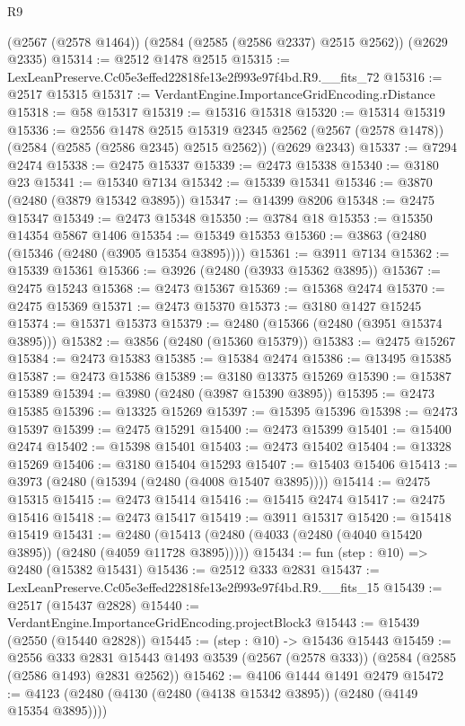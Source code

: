 \begin{lexlean}{R9}
\begin{coremodule}
    (@2567 (@2578 @1464))
    (@2584 (@2585 (@2586 @2337) @2515 @2562))
    (@2629 @2335)
@15314 := @2512 @1478 @2515
@15315 := LexLeanPreserve.Cc05e3effed22818fe13e2f993e97f4bd.R9.__fits_72
@15316 := @2517 @15315
@15317 := VerdantEngine.ImportanceGridEncoding.rDistance
@15318 := @58 @15317
@15319 := @15316 @15318
@15320 := @15314 @15319
@15336 := @2556
    @1478
    @2515
    @15319
    @2345
    @2562
    (@2567 (@2578 @1478))
    (@2584 (@2585 (@2586 @2345) @2515 @2562))
    (@2629 @2343)
@15337 := @7294 @2474
@15338 := @2475 @15337
@15339 := @2473 @15338
@15340 := @3180 @23
@15341 := @15340 @7134
@15342 := @15339 @15341
@15346 := @3870 (@2480 (@3879 @15342 @3895))
@15347 := @14399 @8206
@15348 := @2475 @15347
@15349 := @2473 @15348
@15350 := @3784 @18
@15353 := @15350 @14354 @5867 @1406
@15354 := @15349 @15353
@15360 := @3863 (@2480 (@15346 (@2480 (@3905 @15354 @3895))))
@15361 := @3911 @7134
@15362 := @15339 @15361
@15366 := @3926 (@2480 (@3933 @15362 @3895))
@15367 := @2475 @15243
@15368 := @2473 @15367
@15369 := @15368 @2474
@15370 := @2475 @15369
@15371 := @2473 @15370
@15373 := @3180 @1427 @15245
@15374 := @15371 @15373
@15379 := @2480 (@15366 (@2480 (@3951 @15374 @3895)))
@15382 := @3856 (@2480 (@15360 @15379))
@15383 := @2475 @15267
@15384 := @2473 @15383
@15385 := @15384 @2474
@15386 := @13495 @15385
@15387 := @2473 @15386
@15389 := @3180 @13375 @15269
@15390 := @15387 @15389
@15394 := @3980 (@2480 (@3987 @15390 @3895))
@15395 := @2473 @15385
@15396 := @13325 @15269
@15397 := @15395 @15396
@15398 := @2473 @15397
@15399 := @2475 @15291
@15400 := @2473 @15399
@15401 := @15400 @2474
@15402 := @15398 @15401
@15403 := @2473 @15402
@15404 := @13328 @15269
@15406 := @3180 @15404 @15293
@15407 := @15403 @15406
@15413 := @3973 (@2480 (@15394 (@2480 (@4008 @15407 @3895))))
@15414 := @2475 @15315
@15415 := @2473 @15414
@15416 := @15415 @2474
@15417 := @2475 @15416
@15418 := @2473 @15417
@15419 := @3911 @15317
@15420 := @15418 @15419
@15431 := @2480 (@15413 (@2480 (@4033 (@2480 (@4040 @15420 @3895)) (@2480 (@4059 @11728 @3895)))))
@15434 := fun (step : @10) => @2480 (@15382 @15431)
@15436 := @2512 @333 @2831
@15437 := LexLeanPreserve.Cc05e3effed22818fe13e2f993e97f4bd.R9.__fits_15
@15439 := @2517 (@15437 @2828)
@15440 := VerdantEngine.ImportanceGridEncoding.projectBlock3
@15443 := @15439 (@2550 (@15440 @2828))
@15445 := (step : @10) -> @15436 @15443
@15459 := @2556
    @333
    @2831
    @15443
    @1493
    @3539
    (@2567 (@2578 @333))
    (@2584 (@2585 (@2586 @1493) @2831 @2562))
@15462 := @4106 @1444 @1491 @2479
@15472 := @4123 (@2480 (@4130 (@2480 (@4138 @15342 @3895)) (@2480 (@4149 @15354 @3895))))

\end{coremodule}
\end{lexlean}
